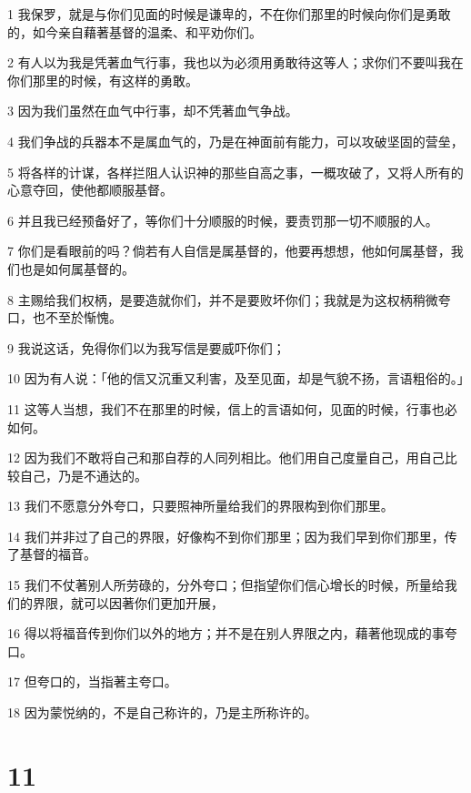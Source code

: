 \par 1 我保罗，就是与你们见面的时候是谦卑的，不在你们那里的时候向你们是勇敢的，如今亲自藉著基督的温柔、和平劝你们。
\par 2 有人以为我是凭著血气行事，我也以为必须用勇敢待这等人；求你们不要叫我在你们那里的时候，有这样的勇敢。
\par 3 因为我们虽然在血气中行事，却不凭著血气争战。
\par 4 我们争战的兵器本不是属血气的，乃是在神面前有能力，可以攻破坚固的营垒，
\par 5 将各样的计谋，各样拦阻人认识神的那些自高之事，一概攻破了，又将人所有的心意夺回，使他都顺服基督。
\par 6 并且我已经预备好了，等你们十分顺服的时候，要责罚那一切不顺服的人。
\par 7 你们是看眼前的吗？倘若有人自信是属基督的，他要再想想，他如何属基督，我们也是如何属基督的。
\par 8 主赐给我们权柄，是要造就你们，并不是要败坏你们；我就是为这权柄稍微夸口，也不至於惭愧。
\par 9 我说这话，免得你们以为我写信是要威吓你们；
\par 10 因为有人说：「他的信又沉重又利害，及至见面，却是气貌不扬，言语粗俗的。」
\par 11 这等人当想，我们不在那里的时候，信上的言语如何，见面的时候，行事也必如何。
\par 12 因为我们不敢将自己和那自荐的人同列相比。他们用自己度量自己，用自己比较自己，乃是不通达的。
\par 13 我们不愿意分外夸口，只要照神所量给我们的界限构到你们那里。
\par 14 我们并非过了自己的界限，好像构不到你们那里；因为我们早到你们那里，传了基督的福音。
\par 15 我们不仗著别人所劳碌的，分外夸口；但指望你们信心增长的时候，所量给我们的界限，就可以因著你们更加开展，
\par 16 得以将福音传到你们以外的地方；并不是在别人界限之内，藉著他现成的事夸口。
\par 17 但夸口的，当指著主夸口。
\par 18 因为蒙悦纳的，不是自己称许的，乃是主所称许的。

\chapter{11}

